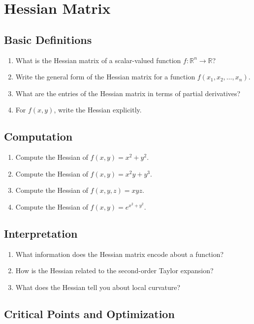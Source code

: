 \section{Hessian Matrix}

\subsection{Basic Definitions}

\begin{enumerate}
  \item What is the Hessian matrix of a scalar-valued function $f:\mathbb{R}^n \to \mathbb{R}$?
  \item Write the general form of the Hessian matrix for a function $f(x_1, x_2, \dots, x_n)$.
  \item What are the entries of the Hessian matrix in terms of partial derivatives?
  \item For $f(x,y)$, write the Hessian explicitly.
\end{enumerate}

\subsection{Computation}

\begin{enumerate}[resume]
  \item Compute the Hessian of $f(x,y) = x^2 + y^2$.
  \item Compute the Hessian of $f(x,y) = x^2 y + y^3$.
  \item Compute the Hessian of $f(x,y,z) = xyz$.
  \item Compute the Hessian of $f(x,y) = e^{x^2 + y^2}$.
\end{enumerate}

\subsection{Interpretation}

\begin{enumerate}[resume]
  \item What information does the Hessian matrix encode about a function?
  \item How is the Hessian related to the second-order Taylor expansion?
  \item What does the Hessian tell you about local curvature?
\end{enumerate}

\subsection{Critical Points and Optimization}

